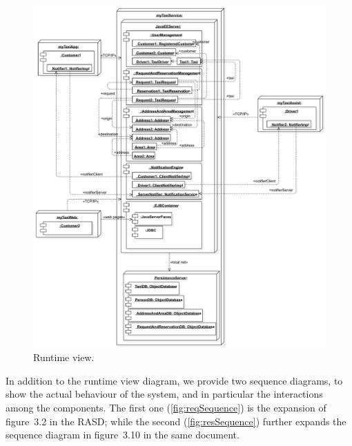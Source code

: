 \begin{figure}%
	\centering%
	\includegraphics[width=\linewidth]{img/Runtime__RuntimeView_5}%
	\caption{Runtime view.}\label{fig:runtime}%
\end{figure}




\clearpage%





In addition to the runtime view diagram, we provide two sequence diagrams, to show the actual behaviour of the system, and in particular the interactions among the components. The first one (\cref{fig:reqSequence}) is the expansion of figure~3.2 in the RASD; while the second (\cref{fig:resSequence}) further expands the sequence diagram in figure~3.10 in the same document.

